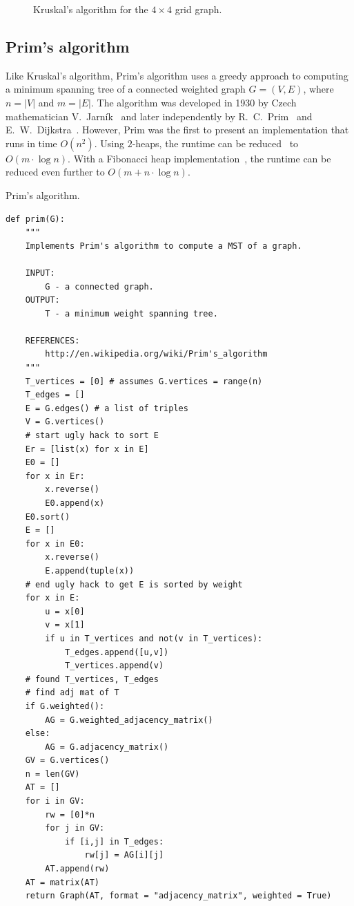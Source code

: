 \begin{figure}[!htbp]
\centering

\caption{Kruskal's algorithm for the $4\times 4$ grid graph.}
\label{fig:trees-forests:Kruskal_example}
\end{figure}



\subsection{Prim's algorithm}
\label{subsec:trees_forests:Prim_algorithm}

Like Kruskal's algorithm, Prim's algorithm uses a greedy approach to
computing a minimum spanning tree of a connected weighted graph
$G = (V,E)$, where $n = |V|$ and $m = |E|$. The algorithm was
developed in 1930 by Czech mathematician V.~Jarn\'ik~\cite{Jarnik1930}
and later independently by R.~C.~Prim~\cite{Prim1957} and
E.~W.~Dijkstra~\cite{Dijkstra1959}. However, Prim was the first to
present an implementation that runs in time $O(n^2)$. Using $2$-heaps,
the runtime can be reduced~\cite{KershenbaumVanSlyke1972} to
$O(m \cdot \log n)$. With a Fibonacci heap
implementation~\cite{FredmanTarjan1984,FredmanTarjan1987}, the runtime
can be reduced even further to $O(m + n \cdot \log n)$.

\begin{algorithm}[!htbp]

\caption{Prim's algorithm.}
\label{alg:trees_forests:prim}
\end{algorithm}

\begin{lstlisting}
def prim(G):
    """
    Implements Prim's algorithm to compute a MST of a graph.

    INPUT:
        G - a connected graph.
    OUTPUT:
        T - a minimum weight spanning tree.

    REFERENCES:
        http://en.wikipedia.org/wiki/Prim's_algorithm
    """
    T_vertices = [0] # assumes G.vertices = range(n)
    T_edges = []
    E = G.edges() # a list of triples
    V = G.vertices()
    # start ugly hack to sort E
    Er = [list(x) for x in E]
    E0 = []
    for x in Er:
        x.reverse()
        E0.append(x)
    E0.sort()
    E = []
    for x in E0:
        x.reverse()
        E.append(tuple(x))
    # end ugly hack to get E is sorted by weight
    for x in E:
        u = x[0]
        v = x[1]
        if u in T_vertices and not(v in T_vertices):
            T_edges.append([u,v])
            T_vertices.append(v)
    # found T_vertices, T_edges
    # find adj mat of T
    if G.weighted():
        AG = G.weighted_adjacency_matrix()
    else:
        AG = G.adjacency_matrix()
    GV = G.vertices()
    n = len(GV)
    AT = []
    for i in GV:
        rw = [0]*n
        for j in GV:
            if [i,j] in T_edges:
                rw[j] = AG[i][j]
        AT.append(rw)
    AT = matrix(AT)
    return Graph(AT, format = "adjacency_matrix", weighted = True)
\end{lstlisting}

